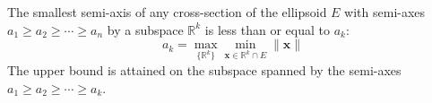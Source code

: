 The smallest semi-axis of any cross-section of the ellipsoid $E$ with semi-axes $a_1 \geq a_2 \geq \cdots \geq a_n$ by a subspace $\mathbb{R}^k$ is less than or equal to $a_k$:
$$a_k = \max_{\{\mathbb{R}^k\}} \min_{\mathbf{x} \in \mathbb{R}^k \cap E} \|\mathbf{x}\|$$
The upper bound is attained on the subspace spanned by the semi-axes $a_1 \geq a_2 \geq \cdots \geq a_k$.
